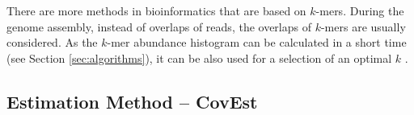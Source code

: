 \medskip

There are more methods in bioinformatics that are based on $k$-mers. During the genome assembly, instead of overlaps of reads, the overlaps of $k$-mers are usually
considered. As the $k$-mer abundance histogram can be calculated in a short time (see Section \ref{sec:algorithms}), it can be also used for
a selection of an optimal $k$ \cite{Chikhi2013}.

\subsection{Estimation Method -- CovEst}
